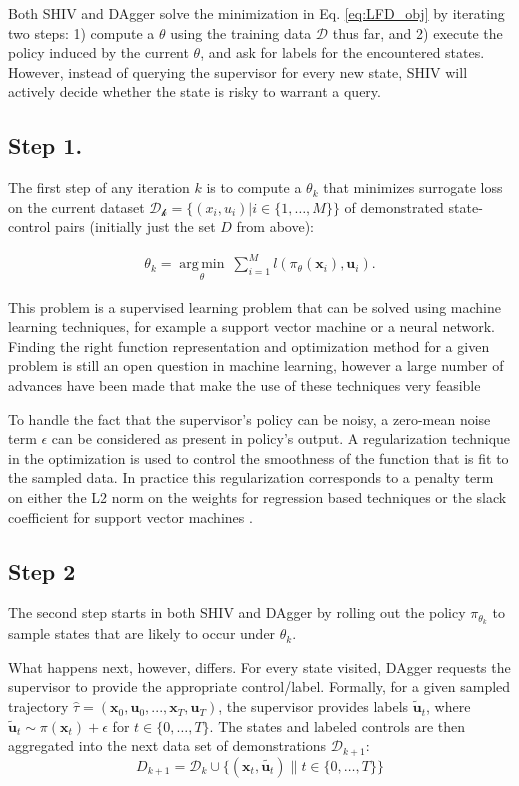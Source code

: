 \documentclass[10pt, conference]{ieeeconf}      %
\DeclareMathOperator*{\argmin}{arg\,min}
\newcommand{\bu}{\mathbf{u}}
\newcommand{\bx}{\mathbf{x}}
\newcommand{\fpnote}[1]{\ifthenelse{\boolean{include-notes}}%
 {\textcolor{blue}{\textbf{FP: #1}}}{}}
\begin{document}
Both SHIV and DAgger \cite{ross2010reduction} solve the minimization in Eq. \ref{eq:LFD_obj} by iterating two steps: 1) compute a $\theta$ using the training data $\mathcal{D}$ thus far, and 2) execute the policy induced by the current $\theta$, and ask for labels for the encountered states. However, instead of querying the supervisor for every new state, SHIV will actively decide whether the state is risky to warrant a query. 


\subsection{Step 1.}
The first step of any iteration $k$ is to compute a $\theta_k$ that minimizes surrogate loss on the current dataset $\mathcal{D_k}=\{(x_i,u_i)|i\in\{1,\ldots,M\}\}$ of demonstrated state-control pairs (initially just the set $D$ from above):


 \vspace{-2ex}
\begin{align}\label{eq:super_objj}
\theta_{k} = \underset{\theta}{\argmin} \: \sum_{i=1}^{M} l(\pi_{\theta}(\bx_i),\bu_i).
\end{align}


This problem is a supervised learning problem that can be solved using machine learning techniques, for example a support vector machine or a neural network. Finding the right function representation and optimization method for a given problem is still an open question in machine learning, however a large number of advances have been made that make the use of these techniques very feasible \cite{scholkopf2002learning}
 
To handle the fact that the supervisor's policy can be noisy, a zero-mean noise term $\epsilon$ 
can be considered as present in policy's output.  A regularization technique in the optimization is
used to control the smoothness of the function that is fit to the sampled data. In practice this regularization corresponds to a penalty term on either the L2 norm on the weights for regression based techniques or the slack coefficient for support vector machines \cite{scholkopf2002learning}.
 \subsection{Step 2}
The second step starts in both SHIV and DAgger by rolling out the policy $\pi_{\theta_{k}}$ to sample states that are likely to occur under $\theta_{k}$. 

What happens next, however, differs. For every state visited, DAgger requests the supervisor to provide the appropriate control/label. Formally, for a given sampled trajectory  $\hat{\tau} = (\bx_0,\bu_0,...,\bx_T,\bu_T )$, the supervisor provides labels $\tilde{\bu}_t$, where $\tilde{\bu}_t \sim \pi(\bx_t) + \epsilon$ for $t\in \{0, \ldots, T\}$.
The states and labeled controls are then aggregated into the next data set of demonstrations $\mathcal{D}_{k+1}$:
$$D_{k+1}=\mathcal{D}_k \cup \{(\bx_t,\tilde{\bu_t})\|t\in\{0,\ldots,T\}\} $$
\end{document}
